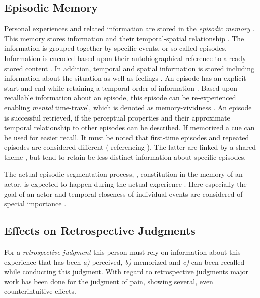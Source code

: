 \subsection{Episodic Memory}
Personal experiences and related information are stored in the \emph{episodic memory} \citep{tulving_episodic_1972}.
This memory stores information and their temporal-spatial relationship \citep[][p. 385]{tulving_episodic_1972}.
The information is grouped together by specific events, or so-called episodes.
Information is encoded based upon their autobiographical reference to already stored content \citep[][p. 385f.]{tulving_episodic_1972}.
In addition, temporal and spatial information is stored including information about the situation as well as feelings \citep[][p. 385f.]{tulving_episodic_1972}.
An episode has an explicit start and end while retaining a temporal order of information \citep[][p. 262]{conway_construction_2000}.
Based upon recallable information about an episode, this episode can be re-experienced enabling \emph{mental} time-travel, which is denoted as memory-vividness \citep{conway_construction_2000}.
An episode is successful retrieved, if the perceptual properties and their approximate temporal relationship to other episodes can be described.
If memorized a cue can be used for easier recall.
It must be noted that first-time episodes and repeated episodes are considered different (\citet{conway_construction_2000} referencing \citet{barsalou_construction_1988}).
The latter are linked by a shared theme \citep{robinson_first_1992}, but tend to retain be less distinct information about specific episodes.

The actual episodic segmentation process, \ie, constitution in the memory of an actor, is expected to happen during the actual experience \citep{ezzyat_what_2011, kurby_segmentation_2008}.
Here especially the goal of an actor and temporal closeness of individual events are considered of special importance \cite{black_episodes_1979}.

\subsection{Effects on Retrospective Judgments}
For a \emph{retrospective judgment} this person must rely on information about this experience that has been \emph{a)} perceived, \emph{b)} memorized and \emph{c)} can been recalled while conducting this judgment.
With regard to retrospective judgments major work has been done for the judgment of pain, showing several, even counterintuitive effects.

